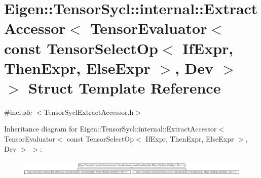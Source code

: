 \hypertarget{struct_eigen_1_1_tensor_sycl_1_1internal_1_1_extract_accessor_3_01_tensor_evaluator_3_01const_015fb0e3d50888e2609204b1bb14cbb286}{}\section{Eigen\+:\+:Tensor\+Sycl\+:\+:internal\+:\+:Extract\+Accessor$<$ Tensor\+Evaluator$<$ const Tensor\+Select\+Op$<$ If\+Expr, Then\+Expr, Else\+Expr $>$, Dev $>$ $>$ Struct Template Reference}
\label{struct_eigen_1_1_tensor_sycl_1_1internal_1_1_extract_accessor_3_01_tensor_evaluator_3_01const_015fb0e3d50888e2609204b1bb14cbb286}


{\ttfamily \#include $<$Tensor\+Sycl\+Extract\+Accessor.\+h$>$}

Inheritance diagram for Eigen\+:\+:Tensor\+Sycl\+:\+:internal\+:\+:Extract\+Accessor$<$ Tensor\+Evaluator$<$ const Tensor\+Select\+Op$<$ If\+Expr, Then\+Expr, Else\+Expr $>$, Dev $>$ $>$\+:\begin{figure}[H]
\begin{center}
\leavevmode
\includegraphics[height=0.749665cm]{struct_eigen_1_1_tensor_sycl_1_1internal_1_1_extract_accessor_3_01_tensor_evaluator_3_01const_015fb0e3d50888e2609204b1bb14cbb286}
\end{center}
\end{figure}
